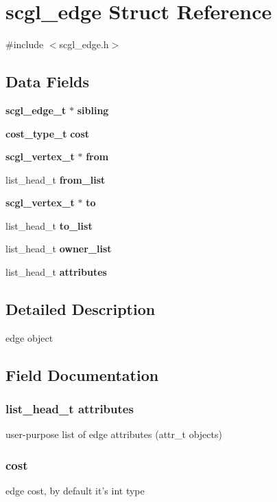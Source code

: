 \section{scgl\-\_\-edge Struct Reference}
\label{structscgl__edge}


{\ttfamily \#include $<$scgl\-\_\-edge.\-h$>$}

\subsection*{Data Fields}
\begin{DoxyCompactItemize}
\item 
{\bf scgl\-\_\-edge\-\_\-t} $\ast$ {\bf sibling}
\item 
{\bf cost\-\_\-type\-\_\-t} {\bf cost}
\item 
{\bf scgl\-\_\-vertex\-\_\-t} $\ast$ {\bf from}
\item 
list\-\_\-head\-\_\-t {\bf from\-\_\-list}
\item 
{\bf scgl\-\_\-vertex\-\_\-t} $\ast$ {\bf to}
\item 
list\-\_\-head\-\_\-t {\bf to\-\_\-list}
\item 
list\-\_\-head\-\_\-t {\bf owner\-\_\-list}
\item 
list\-\_\-head\-\_\-t {\bf attributes}
\end{DoxyCompactItemize}


\subsection{Detailed Description}
edge object 

\subsection{Field Documentation}
\subsubsection[{attributes}]{\setlength{\rightskip}{0pt plus 5cm}list\-\_\-head\-\_\-t {\bf attributes}}\label{structscgl__edge_a35b0b90071708fc088a15f65ccdf63b4}
user-\/purpose list of edge attributes (attr\-\_\-t objects) 
\subsubsection[{cost}]{ {\bf cost}}\label{structscgl__edge_a810ad7c2808df6bed0a30517197768e6}
edge cost, by default it's int type 
